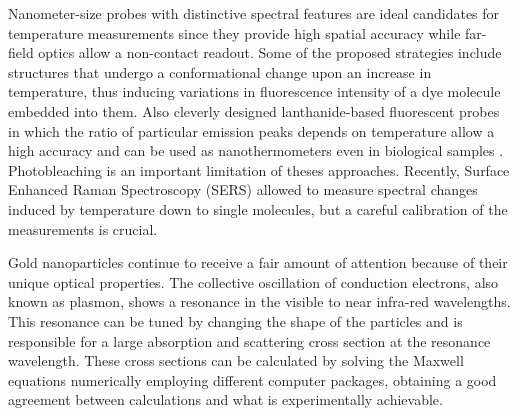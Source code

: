 \documentclass[journal=nalefd,manuscript=letter]{achemso}
\begin{document}
Nanometer-size probes with distinctive spectral features are ideal candidates for temperature
measurements since they provide high spatial accuracy while far-field optics
allow a non-contact readout. Some of the proposed strategies include structures
that undergo a conformational change upon an increase in
temperature\cite{Ebrahimi2014}, thus inducing variations in fluorescence
intensity of a dye molecule embedded into them. 
Also cleverly designed lanthanide-based fluorescent probes in which the ratio of particular emission
peaks depends on temperature allow a high accuracy and can be used as nanothermometers \cite{liu2016ratiometric} 
even in biological samples \cite{Vetrone2010}.
Photobleaching is an important limitation of theses approaches.
Recently, Surface Enhanced Raman Spectroscopy (SERS) allowed to measure spectral 
changes induced by temperature down to single molecules\cite{Pozzi2015}, 
but a careful calibration of the measurements is crucial.


Gold nanoparticles continue to receive a fair amount of attention because of
their unique optical properties\cite{Zijlstra2011}. The collective oscillation
of conduction electrons, also known as plasmon, shows a resonance in the visible to
near infra-red wavelengths. This resonance can be tuned by changing the shape of
the particles\cite{Carattino2016} and is responsible for a large absorption
and scattering cross section at the resonance wavelength. These cross sections can
be calculated by solving the Maxwell equations numerically employing different computer
packages\cite{Draine1994,Yurkin2011,Oskooi2010}, obtaining a good agreement
between calculations and what is experimentally achievable. 
\end{document}

